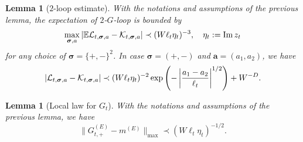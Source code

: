 \documentclass[10pt,reqno]{article}
\DeclareMathOperator{\im}{{\mathrm{Im}}}
\theoremstyle{plain} %
\newtheorem{lemma}[theorem]{Lemma}
\theoremstyle{remark}
\numberwithin{equation}{section}
\begin{document}
\begin{lemma}[$2$-loop estimate]\label{ML:GLoop_expec}
With the notations and assumptions of the previous lemma, 
the expectation of  $2$-$G$-loop is bounded by  
\begin{equation}\label{Eq:Gtlp_exp}
 \max_{\boldsymbol{\sigma}, \textbf{a}}\left|\mathbb E{\cal L}_{t, \boldsymbol{\sigma}, \textbf{a}}-{\cal K}_{t, \boldsymbol{\sigma}, \textbf{a}}\right|\prec (W\ell_t\eta_t)^{-3}
 ,\quad \eta_t:=\im z_t
\end{equation}
for any choice of  $\boldsymbol{\sigma}=\{+,-\}^2$.
In case $\boldsymbol{\sigma}=(+,-)$ and $ \textbf{a}=(a_1, a_2)$, 
we have
\begin{equation}\label{Eq:Gdecay}
 \left| {\cal L}_{t, \boldsymbol{\sigma}, \textbf{a}}-{\cal K}_{t, \boldsymbol{\sigma}, \textbf{a}}\right|\prec (W\ell_t\eta_t)^{-2}\exp \left(-\left|\frac{ a_1-a_2 }{\ell_t}\right|^{1/2}\right)+W^{-D}. 
\end{equation}
\end{lemma}


\begin{lemma}[Local law for $G_t$]\label{ML:GtLocal}
   With the notations and assumptions of the previous lemma, we have 
\begin{equation}\label{Gt_bound}
 \|G^{(E)}_{t,+}-m^{(E)}\|_{\max}\prec (W\ell_t\eta_t)^{-1/2}.
   \end{equation} 
\end{lemma}
 

\medskip 
\end{document}
